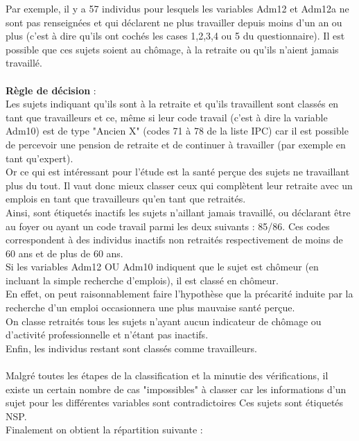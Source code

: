 \documentclass{book}
\begin{document}
\noindent
Par exemple, il y a 57 individus pour lesquels les variables Adm12 et Adm12a ne sont pas renseignées et qui déclarent ne plus travailler depuis moins d'un an ou plus (c'est à dire qu'ils ont cochés les cases 1,2,3,4 ou 5 du questionnaire). Il est possible que ces sujets soient au chômage, à la retraite ou qu'ils n'aient jamais travaillé.\\\\
\noindent
\textbf{Règle de décision} : \\
\noindent
Les sujets indiquant qu'ils sont à la retraite et qu'ils travaillent sont classés en tant que travailleurs et ce, même si leur code travail (c'est à dire la variable Adm10) est de type "Ancien X" (codes 71 à 78 de la liste IPC) car il est possible de percevoir une pension de retraite et de continuer à travailler (par exemple en tant qu'expert). \\
Or ce qui est intéressant pour l'étude est la santé perçue des sujets ne travaillant plus du tout. Il vaut donc mieux classer ceux qui complètent leur retraite avec un emplois en tant que travailleurs qu'en tant que retraités.\\
Ainsi, sont étiquetés inactifs les sujets n'aillant jamais travaillé, ou déclarant être au foyer ou ayant un code travail parmi les deux suivants : 85/86. Ces codes correspondent à des individus inactifs non retraités respectivement de moins de 60 ans et de plus de 60 ans.\\
Si les variables Adm12 OU Adm10 indiquent que le sujet est chômeur (en incluant la simple recherche d'emplois), il est classé en chômeur.\\
En effet, on peut raisonnablement faire l'hypothèse que la précarité induite par la recherche d'un emploi occasionnera une plus mauvaise santé perçue.\\
On classe retraités tous les sujets n'ayant aucun indicateur de chômage ou d'activité professionnelle et n'étant pas inactifs.\\
\noindent
Enfin, les individus restant sont classés comme travailleurs.\\\\
\noindent
Malgré toutes les étapes de la classification et la minutie des vérifications, il  existe un certain nombre de cas "impossibles" à classer car les informations d'un sujet pour les différentes variables sont contradictoires Ces sujets sont étiquetés NSP.\\
\noindent
Finalement on obtient la répartition suivante : \\
\end{document}
